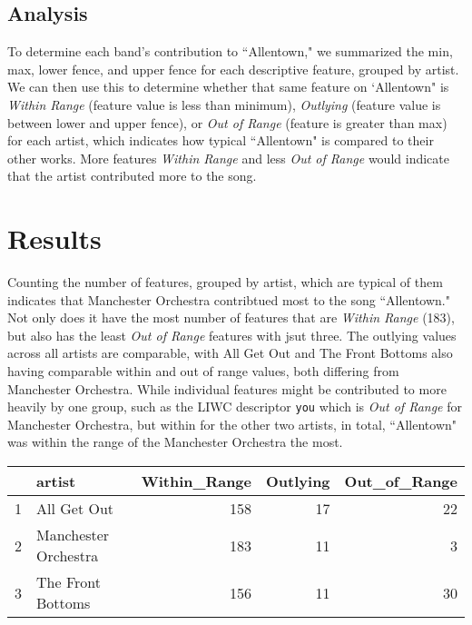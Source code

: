 \documentclass{article}\usepackage[]{graphicx}\usepackage[]{xcolor}
\begin{document}
\begin{multicols}{2}
\subsection{Analysis}
To determine each band's contribution to ``Allentown," we summarized the min, max, lower fence, and upper fence for each descriptive feature, grouped by artist. We can then use this to determine whether that same feature on `Allentown" is \emph{Within Range} (feature value is less than minimum), \emph{Outlying} (feature value is between lower and upper fence), or \emph{Out of Range} (feature is greater than max) for each artist, which indicates how typical ``Allentown" is compared to their other works. More features \emph{Within Range} and less \emph{Out of Range} would indicate that the artist contributed more to the song. 


\section{Results}
Counting the number of features, grouped by artist, which are typical of them indicates that Manchester Orchestra contribtued most to the song ``Allentown." Not only does it have the most number of features that are \emph{Within Range} (183), but also has the least \emph{Out of Range} features with jsut three. The outlying values across all artists are comparable, with All Get Out and The Front Bottoms also having comparable within and out of range values, both differing from Manchester Orchestra. While individual features might be contributed to more heavily by one group, such as the LIWC descriptor \texttt{you} which is \emph{Out of Range} for Manchester Orchestra, but within for the other two artists, in total, ``Allentown" was within the range of the Manchester Orchestra the most.

\begin{table}[ht]
\centering
\begin{tabular}{rlrrr}
  \hline
 & artist & Within\_Range & Outlying & Out\_of\_Range \\ 
  \hline
1 & All Get Out & 158 &  17 &  22 \\ 
  2 & Manchester Orchestra & 183 &  11 &   3 \\ 
  3 & The Front Bottoms & 156 &  11 &  30 \\ 
   \hline
\end{tabular}
\end{table}



\end{multicols}
\end{document}
